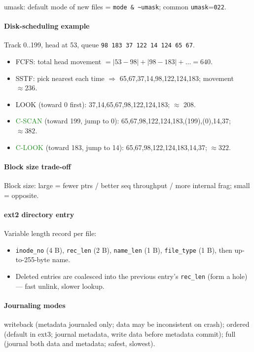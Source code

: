 \textcolor{Bittersweet}{umask}: default mode of new files = \texttt{mode \& \textasciitilde umask}; common \texttt{umask}=\texttt{022}.

\paragraph{Disk-scheduling example}
Track 0..199, head at 53, queue \texttt{98 183 37 122 14 124 65 67}.
\begin{itemize}
  \item \textcolor{Bittersweet}{FCFS}: total head movement $= |53\!-\!98|+|98\!-\!183|+\dots = 640$.
  \item \textcolor{Bittersweet}{SSTF}: pick nearest each time $\Rightarrow$ 65,67,37,14,98,122,124,183; movement $\approx 236$.
  \item \textcolor{Bittersweet}{LOOK} (toward 0 first): 37,14,65,67,98,122,124,183; $\approx$ 208.
  \item \textcolor{ForestGreen}{C-SCAN} (toward 199, jump to 0): 65,67,98,122,124,183,(199),(0),14,37; $\approx 382$.
  \item \textcolor{ForestGreen}{C-LOOK} (toward 183, jump to 14): 65,67,98,122,124,183,14,37; $\approx 322$.
\end{itemize}

\paragraph{Block size trade-off}
\textcolor{Bittersweet}{Block size}: large = fewer ptrs / better seq throughput / more internal frag; small = opposite.

\paragraph{ext2 directory entry}
Variable length record per file:
\begin{itemize}
  \item \texttt{inode\_no} (4 B), \texttt{rec\_len} (2 B), \texttt{name\_len} (1 B), \texttt{file\_type} (1 B), then up-to-255-byte name.
  \item Deleted entries are coalesced into the previous entry's \texttt{rec\_len} (form a hole) — fast unlink, slower lookup.
\end{itemize}

\paragraph{Journaling modes}
\textcolor{Bittersweet}{writeback} (metadata journaled only; data may be inconsistent on crash); \textcolor{Bittersweet}{ordered} (default in ext3; journal metadata, write data before metadata commit); \textcolor{Bittersweet}{full} (journal both data and metadata; safest, slowest).

